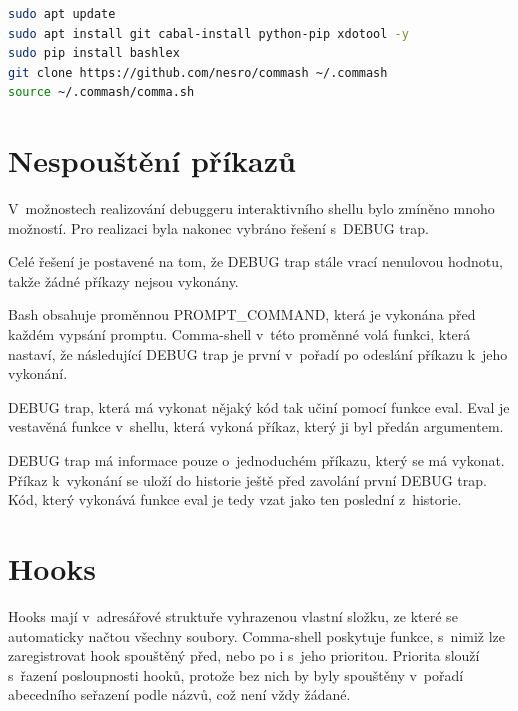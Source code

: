 \documentclass[thesis=M,czech]{FITthesis}[2012/06/26]
\begin{document}
\begin{minipage}{\linewidth}
\begin{lstlisting}[language=bash, caption={Instalace Comma-shellu}, label={lst:csinstall}]
sudo apt update
sudo apt install git cabal-install python-pip xdotool -y
sudo pip install bashlex
git clone https://github.com/nesro/commash ~/.commash
source ~/.commash/comma.sh
\end{lstlisting}
\end{minipage}



%
%
%
%
%
\section{Nespouštění příkazů}\label{sec:debugtraprealization}
V~možnostech realizování debuggeru interaktivního shellu bylo zmíněno mnoho možností. Pro realizaci byla nakonec vybráno řešení s~DEBUG trap.

Celé řešení je postavené na tom, že DEBUG trap stále vrací nenulovou hodnotu, takže žádné příkazy nejsou vykonány.

Bash obsahuje proměnnou PROMPT\_COMMAND, která je vykonána před každém vypsání promptu. Comma-shell v~této proměnné volá funkci, která nastaví, že následující DEBUG trap je první v~pořadí po odeslání příkazu k~jeho vykonání.

DEBUG trap, která má vykonat nějaký kód tak učiní pomocí funkce eval. Eval je vestavěná funkce v~shellu, která vykoná příkaz, který ji byl předán argumentem.

DEBUG trap má informace pouze o~jednoduchém příkazu, který se má vykonat. Příkaz k~vykonání se uloží do historie ještě před zavolání první DEBUG trap. Kód, který vykonává funkce eval je tedy vzat jako ten poslední z~historie.



%
%
%
%
%
\section{Hooks}

Hooks mají v~adresářové struktuře vyhrazenou vlastní složku, ze které se automaticky načtou všechny soubory. Comma-shell poskytuje funkce, s~nimiž lze zaregistrovat hook spouštěný před, nebo po i s~jeho prioritou. Priorita slouží s~řazení posloupnosti hooků, protože bez nich by byly spouštěny v~pořadí abecedního seřazení podle názvů, což není vždy žádané.
\end{document}

